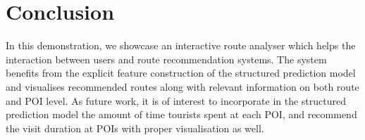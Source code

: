 \section{Conclusion}
In this demonstration, we showcase an interactive route analyser which helps the interaction between users and route recommendation systems. 
The system benefits from the explicit feature construction of the structured prediction model and visualises recommended routes along with relevant information on both route and POI level.
As future work, it is of interest to incorporate in the structured prediction model the amount of time tourists spent at each POI, 
and recommend the visit duration at POIs with proper visualisation as well.
